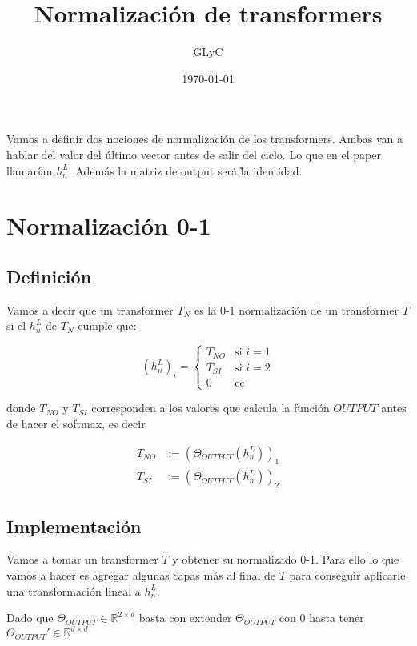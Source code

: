 \documentclass{article}
\title{Normalización de transformers}
\author{GLyC}
\date{\today}
\begin{document}
\maketitle

Vamos a definir dos nociones de normalización de los transformers. Ambas van a hablar del valor del último vector antes de salir del ciclo. Lo que en el paper llamarían $h_n^L$. Además la matriz de output será \~ la identidad.

\section*{Normalización 0-1}

\subsection*{Definición}

Vamos a decir que un transformer $T_N$ es la 0-1 normalización de un transformer $T$ si el $h_n^L$ de $T_N$ cumple que:

\begin{equation*}
(h_n^L)_i =
\begin{cases}
T_{NO} & \text{si } i = 1 \\
T_{SI} & \text{si } i = 2 \\
0 & \text{cc }
\end{cases}
\end{equation*}

donde $T_{NO}$ y $T_{SI}$ corresponden a los valores que calcula la función $OUTPUT$ antes de hacer el softmax, es decir 

\begin{align*}
    T_{NO} &:= (\Theta_{OUTPUT}(h_n^L))_1 \\
    T_{SI} &:= (\Theta_{OUTPUT}(h_n^L))_2 
\end{align*}


\subsection*{Implementación}

Vamos a tomar un transformer $T$ y obtener su normalizado 0-1. Para ello lo que vamos a hacer es agregar algunas capas más al final de $T$ para conseguir aplicarle una transformación lineal a $h_n^L$.

Dado que $\Theta_{OUTPUT} \in \mathbb{R}^{2\times d}$ basta con extender $\Theta_{OUTPUT}$ con $0$ hasta tener $\Theta_{OUTPUT}' \in \mathbb{R}^{d\times d}$
\end{document}
